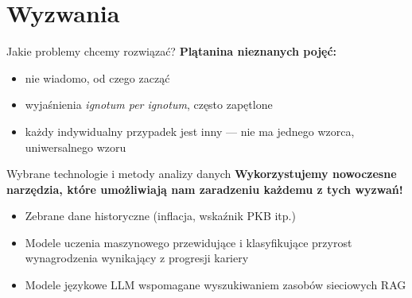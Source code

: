 \section{Wyzwania}

\begin{frame}[t]{Jakie problemy chcemy rozwiązać?}
\textbf{Plątanina nieznanych pojęć:}
    \pause
\begin{itemize}
    \item nie wiadomo, od czego zacząć
    \pause
    \item wyjaśnienia \emph{ignotum per ignotum}, często zapętlone
    \pause
    \item każdy indywidualny przypadek jest inny --- nie ma jednego wzorca, uniwersalnego wzoru
\end{itemize}
\end{frame}

\begin{frame}[t]{Wybrane technologie i metody analizy danych}
\textbf{Wykorzystujemy nowoczesne narzędzia, które umożliwiają nam zaradzeniu każdemu z tych wyzwań!}
    \pause
\begin{itemize}
    \item Zebrane dane historyczne (inflacja, wskaźnik PKB itp.)
    \pause
    \item Modele uczenia maszynowego przewidujące i klasyfikujące przyrost wynagrodzenia wynikający z progresji kariery
    \pause
    \item Modele językowe LLM wspomagane wyszukiwaniem zasobów sieciowych RAG
\end{itemize}
\end{frame}
